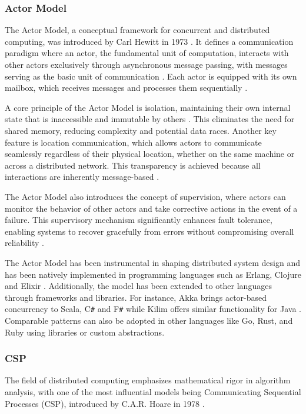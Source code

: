 \subsubsection{Actor Model}

The Actor Model, a conceptual framework for concurrent and distributed computing, was introduced by Carl Hewitt in 1973 \cite{Hewitt1973}. It defines a communication paradigm where an actor, the fundamental unit of computation, interacts with other actors exclusively through asynchronous message passing, with messages serving as the basic unit of communication \cite{Trinder2017}. Each actor is equipped with its own mailbox, which receives messages and processes them sequentially \cite{Koster2016}.

A core principle of the Actor Model is isolation, maintaining their own internal state that is inaccessible and immutable by others \cite{Koster2016}. This eliminates the need for shared memory, reducing complexity and potential data races. Another key feature is location communication, which allows actors to communicate seamlessly regardless of their physical location, whether on the same machine or across a distributed network. This transparency is achieved because all interactions are inherently message-based \cite{Trinder2017}.

The Actor Model also introduces the concept of supervision, where actors can monitor the behavior of other actors and take corrective actions in the event of a failure. This supervisory mechanism significantly enhances fault tolerance, enabling systems to recover gracefully from errors without compromising overall reliability \cite{Trinder2017}.

The Actor Model has been instrumental in shaping distributed system design and has been natively implemented in programming languages such as Erlang, Clojure and Elixir \cite{Randtoul2022}. Additionally, the model has been extended to other languages through frameworks and libraries. For instance, Akka brings actor-based concurrency to Scala, C\texttt{\#} and F\texttt{\#} while Kilim offers similar functionality for Java \cite{Trinder2017}. Comparable patterns can also be adopted in other languages like Go, Rust, and Ruby using libraries or custom abstractions.


\subsubsection{\gls{CSP}}

The field of distributed computing emphasizes mathematical rigor in algorithm analysis, with one of the most influential models being Communicating Sequential Processes (\gls{CSP}), introduced by C.A.R. Hoare in 1978 \cite{Hoare1983}.

